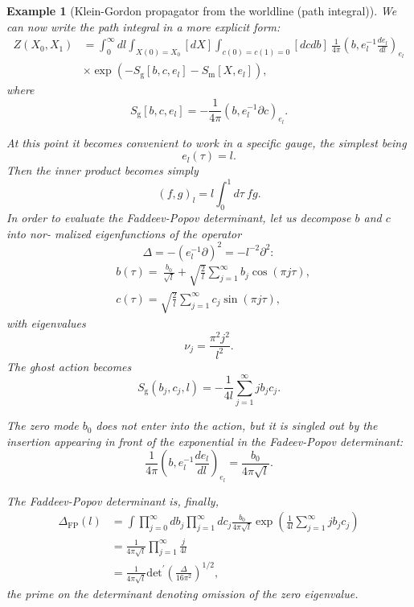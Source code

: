 \documentclass[10pt,
 article,
 amsmath,amssymb
]{revtex4-2}
\newtheorem{example}[theorem]{Example}
\begin{document}
\begin{example}[Klein-Gordon propagator from the worldline (path integral)]
We can now write the path integral in a more explicit form:
$$\begin{aligned}Z(X_{0},X_{1})&=\int_0^\infty dl\int_{X(0)=X_0}[dX]\int_{c(0)=c(1)=0}[dcdb]\:\frac1{4\pi}(b,e_l^{-1}\frac{de_l}{dl})_{e_l}\\&\times\exp\left(-S_{\mathrm{g}}[b,c,e_l]-S_{\mathrm{m}}[X,e_l]\right),\end{aligned}$$
where
$$S_\text{g}[b,c,e_l]=-\frac{1}{4\pi}(b,e_l^{-1}\partial c)_{e_l}.$$

At this point it becomes convenient to work in a specific gauge, the simplest being
$$e_l(\tau)=l.$$
Then the inner product becomes simply
$$(f,g)_l=l\int_0^1d\tau\:fg.$$
In order to evaluate the Faddeev-Popov determinant, let us decompose $b$ and $c$ into nor-
malized eigenfunctions of the operator
$$\Delta=-(e_l^{-1}\partial)^2=-l^{-2}\partial^2:$$
$$\begin{aligned}&b(\tau)=\:\frac{b_{0}}{\sqrt{l}}+\sqrt{\frac{2}{l}}\sum_{j=1}^{\infty}b_{j}\cos(\pi j\tau),\\&c(\tau)=\sqrt{\frac{2}{l}}\sum_{j=1}^{\infty}c_{j}\sin(\pi j\tau),\end{aligned}$$
with eigenvalues
$$\nu_j=\frac{\pi^2j^2}{l^2}.$$
The ghost action becomes
$$S_{\mathrm{g}}(b_j,c_j,l)=-\frac{1}{4l}\sum_{j=1}^{\infty}jb_jc_j.$$

The zero mode $b_0$ does not enter into the action, but it is singled out by the
 insertion appearing in
front of the exponential in the Fadeev-Popov determinant:
$$\frac1{4\pi}(b,e_l^{-1}\frac{de_l}{dl})_{e_l}=\frac{b_0}{4\pi\sqrt{l}}.$$


The Faddeev-Popov determinant is, finally,
$$\begin{aligned}\Delta_{\mathrm{FP}}(l)&=\int\prod_{j=0}^\infty db_j\prod_{j=1}^\infty dc_j\frac{b_0}{4\pi\sqrt{l}}\exp\left(\frac1{4l}\sum_{j=1}^\infty jb_jc_j\right)\\&=\frac1{4\pi\sqrt{l}}\prod_{j=1}^\infty\frac j{4l}\\&=\frac1{4\pi\sqrt{l}}\mathrm{det}^{\prime}\left(\frac\Delta{16\pi^2}\right)^{1/2},\end{aligned}$$
the prime on the determinant denoting omission of the zero eigenvalue.



\end{example}
\end{document}
